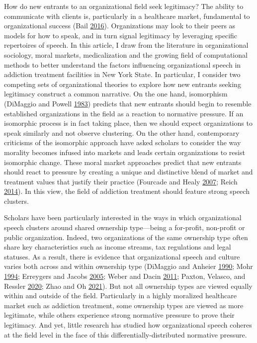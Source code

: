\documentclass[
  12pt,
]{article}
\begin{document}
How do new entrants to an organizational field seek legitimacy? The ability to communicate with clients is, particularly in a healthcare market, fundamental to organizational success (Bail \protect\hyperlink{ref-bail2016}{2016}). Organizations may look to their peers as models for how to speak, and in turn signal legitimacy by leveraging specific repertoires of speech. In this article, I draw from the literature in organizational sociology, moral markets, medicalization and the growing field of computational methods to better understand the factors influencing organizational speech in addiction treatment facilities in New York State. In particular, I consider two competing sets of organizational theories to explore how new entrants seeking legitimacy construct a common narrative. On the one hand, isomorphism (DiMaggio and Powell \protect\hyperlink{ref-dimaggio1983}{1983}) predicts that new entrants should begin to resemble established organizations in the field as a reaction to normative pressure. If an isomorphic process is in fact taking place, then we should expect organizations to speak similarly and not observe clustering. On the other hand, contemporary criticisms of the isomorphic approach have asked scholars to consider the way morality becomes infused into markets and leads certain organizations to resist isomorphic change. These moral market approaches predict that new entrants should react to pressure by creating a unique and distinctive blend of market and treatment values that justify their practice (Fourcade and Healy \protect\hyperlink{ref-fourcade2007}{2007}; Reich \protect\hyperlink{ref-reich2014}{2014}). In this view, the field of addiction treatment should feature strong speech clusters.

\vspace{12pt}

Scholars have been particularly interested in the ways in which organizational speech clusters around shared ownership type---being a for-profit, non-profit or public organization. Indeed, two organizations of the same ownership type often share key characteristics such as income streams, tax regulations and legal statuses. As a result, there is evidence that organizational speech and culture varies both across and within ownership type (DiMaggio and Anheier \protect\hyperlink{ref-dimaggio1990}{1990}; Mohr \protect\hyperlink{ref-mohr1994}{1994}; Erreygers and Jacobs \protect\hyperlink{ref-erreygers2005}{2005}; Weber and Dacin \protect\hyperlink{ref-weber2011}{2011}; Paxton, Velasco, and Ressler \protect\hyperlink{ref-paxton2020}{2020}; Zhao and Oh \protect\hyperlink{ref-zhao2021}{2021}). But not all ownership types are viewed equally within and outside of the field. Particularly in a highly moralized healthcare market such as addiction treatment, some ownership types are viewed as more legitimate, while others experience strong normative pressure to prove their legitimacy. And yet, little research has studied how organizational speech coheres at the field level in the face of this differentially-distributed normative pressure.
\end{document}
